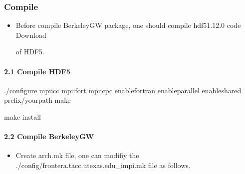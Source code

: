 \documentclass[a4paper,12pt,english]{sphinxmanual}
\begin{document}
\subsubsection{Compile}
\label{\detokenize{compile/BerkeleyGW_3.0.1:compile}}\begin{itemize}
\item {} 
\sphinxAtStartPar
Before compile BerkeleyGW package, one should compile hdf5\sphinxhyphen{}1.12.0 code Download %
\begin{footnote}[24]\sphinxAtStartFootnote
{}
%
\end{footnote} of HDF5.

\end{itemize}


\paragraph{2.1 Compile HDF5}
\label{\detokenize{compile/BerkeleyGW_3.0.1:compile-hdf5}}
\begin{sphinxVerbatim}[commandchars=\\\{\}]
./configure mpiicc mpiifort mpiicpc 
    \PYGZhy{}\PYGZhy{}enable\PYGZhy{}fortran \PYGZhy{}\PYGZhy{}enable\PYGZhy{}parallel \PYGZhy{}\PYGZhy{}enable\PYGZhy{}shared 
    \PYGZhy{}\PYGZhy{}prefix/your\PYGZus{}path
make

make install
\end{sphinxVerbatim}


\paragraph{2.2 Compile BerkeleyGW}
\label{\detokenize{compile/BerkeleyGW_3.0.1:compile-berkeleygw}}\begin{itemize}
\item {} 
\sphinxAtStartPar
Create arch.mk file, one can modifiy the ./config/frontera.tacc.utexas.edu\_impi.mk file as follows.

\end{itemize}
\end{document}
